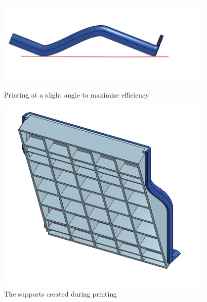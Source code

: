 \begin{figure}[ht]
\centering
\begin{minipage}[b]{.48\textwidth}
  \centering
  \includegraphics[width=0.95\textwidth]{Meetings/November/11-27-21/11-27-21_CAD_Figure3 - Nathan Forrer.JPG}
  \caption{Printing at a slight angle to maximize efficiency}
  \label{fig:112721_3}
\end{minipage}%
\hfill%
\begin{minipage}[b]{.48\textwidth}
  \centering
  \includegraphics[width=0.95\textwidth]{Meetings/November/11-27-21/11-22-21_CAD_Figure4 - Nathan Forrer.PNG}
  \caption{The supports created during printing}
  \label{fig:112721_4}
\end{minipage}
\end{figure}

